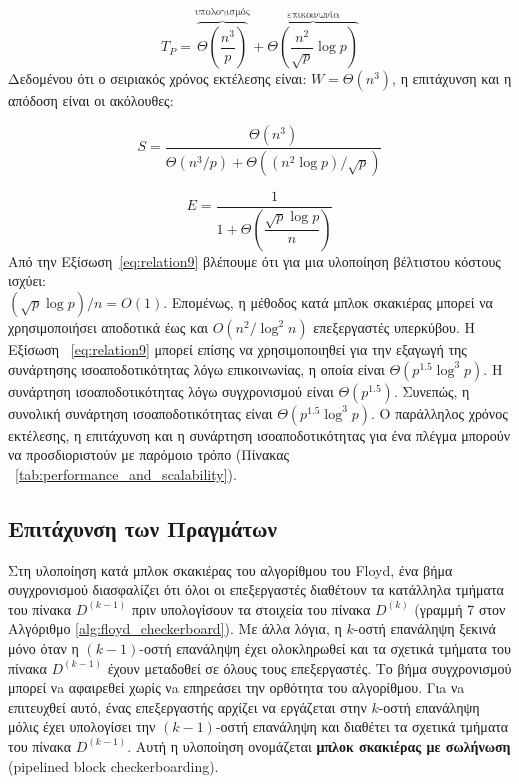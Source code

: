 \documentclass[12pt,a4paper]{article} %
\begin{document}
{{\[
T_P = \overbrace{\Theta\left(\frac{n^3}{p}\right)}^{\text{υπολογισμός}} 
+ \overbrace{\Theta\left(\frac{n^2}{\sqrt{p}} \log p \right)}^{\text{επικοινωνία}}
\]
Δεδομένου ότι ο σειριακός χρόνος εκτέλεσης είναι: $W = \Theta(n^3)$, η επιτάχυνση και η απόδοση είναι οι ακόλουθες:

\[
S = \frac{\Theta(n^3)}{\Theta(n^3/p) + \Theta\left({(n^2 \log p)}/{\sqrt{p}}\right)}
\]

\begin{equation}
E = \frac{1}{1 + \Theta\left(\dfrac{\sqrt{p} \log p}{n}\right)}
\label{eq:relation9}
\end{equation}Από την Εξίσωση~\ref{eq:relation9} βλέπουμε ότι για μια υλοποίηση βέλτιστου κόστους ισχύει:\\
$(\sqrt{p} \log p) / n = O(1)$.
Επομένως, η μέθοδος κατά μπλοκ σκακιέρας μπορεί να χρησιμοποιήσει αποδοτικά έως και $O\left({n^2}/{\log^2 n}\right)$ επεξεργαστές υπερκύβου.
Η Εξίσωση ~\ref{eq:relation9}  μπορεί επίσης να χρησιμοποιηθεί για την εξαγωγή της συνάρτησης ισοαποδοτικότητας λόγω επικοινωνίας, η οποία είναι $\Theta(p^{1.5} \log^3 p)$.
Η συνάρτηση ισοαποδοτικότητας λόγω συγχρονισμού είναι $\Theta(p^{1.5})$.
Συνεπώς, η συνολική συνάρτηση ισοαποδοτικότητας είναι $\Theta(p^{1.5} \log^3 p)$.
Ο παράλληλος χρόνος εκτέλεσης, η επιτάχυνση και η συνάρτηση ισοαποδοτικότητας για ένα πλέγμα μπορούν να προσδιοριστούν με παρόμοιο τρόπο (Πίνακας ~\ref{tab:performance_and_scalability}).

\subsection*{Επιτάχυνση των Πραγμάτων}
Στη υλοποίηση κατά μπλοκ σκακιέρας του αλγορίθμου του Floyd, ένα βήμα συγχρονισμού διασφαλίζει ότι όλοι οι επεξεργαστές διαθέτουν τα κατάλληλα τμήματα του πίνακα $D^{(k-1)}$ πριν υπολογίσουν τα στοιχεία του πίνακα $D^{(k)}$ (γραμμή 7 στον Αλγόριθμο \ref{alg:floyd_checkerboard}). Με άλλα λόγια, η $k$-οστή επανάληψη ξεκινά μόνο όταν η $(k-1)$-οστή επανάληψη έχει ολοκληρωθεί και τα σχετικά τμήματα του πίνακα $D^{(k-1)}$ έχουν μεταδοθεί σε όλους τους επεξεργαστές. Το βήμα συγχρονισμού μπορεί νa αφαιρεθεί χωρίς νa επηρεάσει την ορθότητα του αλγορίθμου. Γιa νa επιτευχθεί αυτό, 
ένας επεξεργαστής αρχίζει να εργάζεται στην $k$-οστή επανάληψη μόλις έχει υπολογίσει την $(k-1)$-οστή επανάληψη και διαθέτει τα σχετικά τμήματα του πίνακα $D^{(k-1)}$. Αυτή η υλοποίηση ονομάζεται \textbf{μπλοκ σκακιέρας με σωλήνωση} (pipelined block checkerboarding). 

}}
\end{document}
